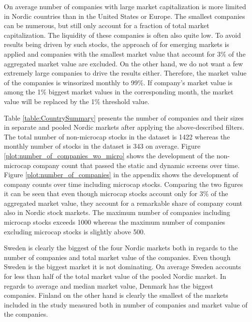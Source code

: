 \documentclass[12pt]{article}
\begin{document}
On average number of companies with large market capitalization is more limited in Nordic countries than in the United States or Europe. The smallest companies can be numerous, but still only account for a fraction of total market capitalization. The liquidity of these companies is often also quite low. To avoid results being driven by such stocks, the approach of \citet{HANAUER2023} for emerging markets is applied and companies with the smallest market value that account for 3\% of the aggregated market value are excluded. On the other hand, we do not want a few extremely large companies to drive the results either. Therefore, the market value of the companies is winsorized monthly to 99\%. If company's market value is among the 1\% biggest market values in the corresponding month, the market value will be replaced by the 1\% threshold value.\footnotemark {} \par

Table \ref{table:CountrySummary} presents the number of companies and their sizes in separate and pooled Nordic markets after applying the above-described filters. The total number of non-microcap stocks in the dataset is 1422 whereas the monthly number of stocks in the dataset is 343 on average. Figure \ref{plot:number_of_companies_wo_micro} shows the development of the non-microcap company count that passed the static and dynamic screens over time. Figure \ref{plot:number_of_companies} in the appendix shows the development of company counts over time including microcap stocks. Comparing the two figures it can be seen that even though microcap stocks account only for 3\% of the aggregated market value, they account for a remarkable share of company count also in Nordic stock markets. The maximum number of companies including microcap stocks exceeds 1000 whereas the maximum number of companies excluding microcap stocks is slightly above 500. \par

Sweden is clearly the biggest of the four Nordic markets both in regards to the number of companies and total market value of the companies. Even though Sweden is the biggest market it is not dominating. On average Sweden accounts for less than half of the total market value of the pooled Nordic market. In regards to average and median market value, Denmark has the biggest companies. Finland on the other hand is clearly the smallest of the markets included in the study measured both in number of companies and market value of the companies. \par
\end{document}
